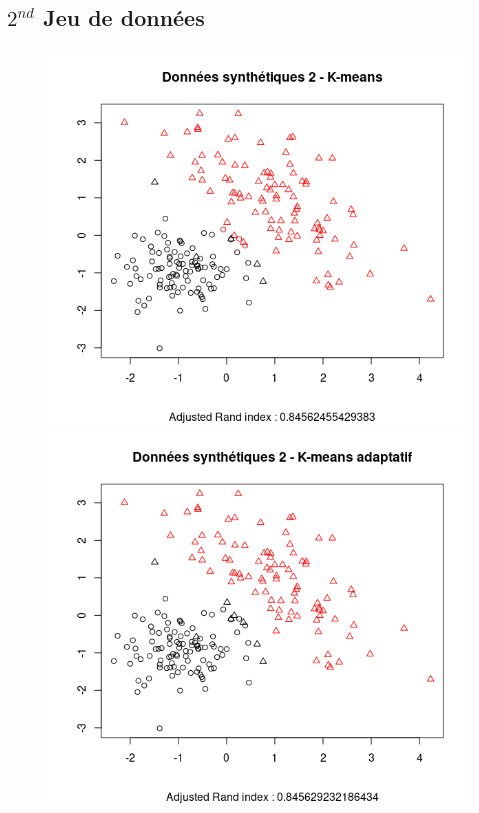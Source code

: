 \documentclass[a4paper, titlepage]{report}
\begin{document}
\subsection*{$2^{nd}$ Jeu de données}

\begin{figure}[h]
	\begin{center}
		\includegraphics[scale = 0.35]{./doc/synt-2-k.png}
		\includegraphics[scale = 0.35]{./doc/synt-2-ka.png}
	\end{center}
\end{figure}
\end{document}
